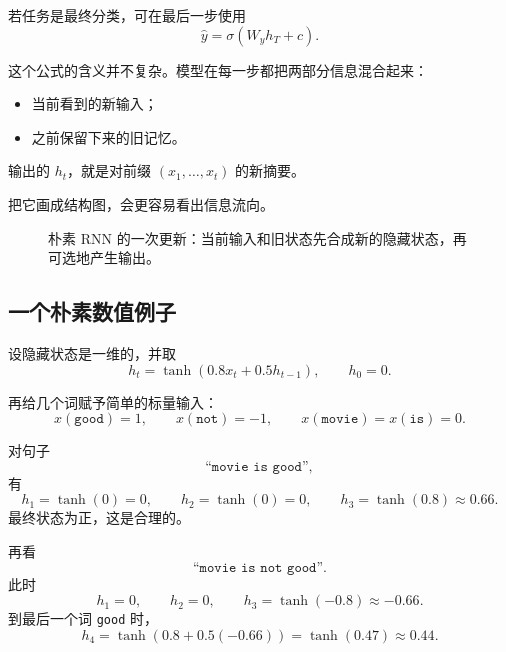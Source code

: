 \documentclass[12pt,a4paper]{ctexart}
\begin{document}
若任务是最终分类，可在最后一步使用
\[
\hat{y} = \sigma(W_y h_T + c).
\]

这个公式的含义并不复杂。模型在每一步都把两部分信息混合起来：
\begin{itemize}
  \item 当前看到的新输入；
  \item 之前保留下来的旧记忆。
\end{itemize}

输出的 \(h_t\)，就是对前缀 \((x_1,\dots,x_t)\) 的新摘要。

把它画成结构图，会更容易看出信息流向。

\begin{figure}[htbp]
\centering
{}
\caption{朴素 RNN 的一次更新：当前输入和旧状态先合成新的隐藏状态，再可选地产生输出。}
\label{fig:rnn-zh}
\end{figure}

\subsection{一个朴素数值例子}

设隐藏状态是一维的，并取
\[
h_t = \tanh(0.8x_t + 0.5h_{t-1}),
\qquad
h_0 = 0.
\]

再给几个词赋予简单的标量输入：
\[
x(\texttt{good}) = 1,\qquad
x(\texttt{not}) = -1,\qquad
x(\texttt{movie}) = x(\texttt{is}) = 0.
\]

对句子
\[
\texttt{``movie is good''},
\]
有
\[
h_1 = \tanh(0) = 0,\qquad
h_2 = \tanh(0) = 0,\qquad
h_3 = \tanh(0.8) \approx 0.66.
\]
最终状态为正，这是合理的。

再看
\[
\texttt{``movie is not good''}.
\]
此时
\[
h_1 = 0,\qquad
h_2 = 0,\qquad
h_3 = \tanh(-0.8) \approx -0.66.
\]
到最后一个词 \texttt{good} 时，
\[
h_4 = \tanh(0.8 + 0.5(-0.66))
     = \tanh(0.47)
     \approx 0.44.
\]
\end{document}
